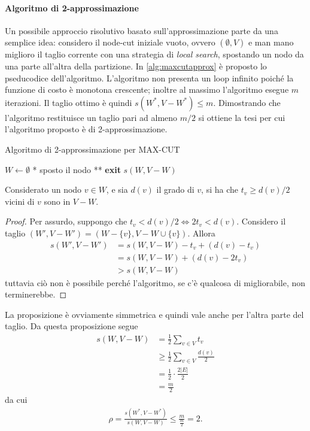 \paragraph{Algoritmo di 2-approssimazione}
Un possibile approccio risolutivo basato sull'approssimazione parte da una semplice idea: considero il node-cut iniziale vuoto, ovvero $(\emptyset, V)$ e man mano miglioro il taglio corrente con una strategia di \textit{local search}, spostando un nodo da una parte all'altra della partizione. In \ref{alg:maxcutapprox} è proposto lo pseducodice dell'algoritmo. L'algoritmo non presenta un loop infinito poiché la funzione di costo è monotona crescente; inoltre al massimo l'algoritmo esegue $m$ iterazioni. Il taglio ottimo è quindi $s(W^*,V-W^*)\leq m$. Dimostrando che l'algoritmo restituisce un taglio pari ad almeno $m/2$ si ottiene la tesi per cui l'algoritmo proposto è di 2-approssimazione.

\begin{algorithm}
\caption{Algoritmo di 2-approssimazione per MAX-CUT}
\label{alg:maxcutapprox}
\begin{algorithmic}
	\State $W\gets\emptyset$
			\State ** sposto il nodo **
		\Else
			\State \textbf{exit}
		\EndIf
	\EndWhile
	\State \Return $s(W,V-W)$
\EndFunction
\end{algorithmic}
\end{algorithm}

\begin{proposizione}
Considerato un nodo $v\in W$, e sia $d(v)$ il grado di $v$, si ha che $t_v\geq d(v)/2$ vicini di $v$ sono in $V-W$.
\end{proposizione}
\begin{proof}
Per assurdo, suppongo che $t_v < d(v)/2 \Leftrightarrow 2t_v < d(v)$. Considero il taglio $(W', V-W')=(W-\{v\},V-W\cup\{v\})$. Allora
\begin{align*}
s(W', V-W')&=s(W, V-W)-t_v+(d(v)-t_v) \\
&=s(W, V-W) + (d(v)-2t_v) \\
&>s(W, V-W)
\end{align*}
tuttavia ciò non è possibile perché l'algoritmo, se c'è qualcosa di migliorabile, non terminerebbe.
\end{proof}

La proposizione è ovviamente simmetrica e quindi vale anche per l'altra parte del taglio. Da questa proposizione segue
\begin{align*}
s(W, V-W)&=\frac{1}{2}\sum_{v\in V}t_v \\
&\geq \frac{1}{2}\sum_{v\in V}\frac{d(v)}{2} \\
&=\frac{1}{2}\cdot\frac{2|E|}{2}\\
&=\frac{m}{2}
\end{align*}
da cui
\begin{align*}
\rho = \frac{s(W^*, V-W^*)}{s(W, V-W)} \leq \frac{m}{\frac{m}{2}} = 2.
\end{align*}

